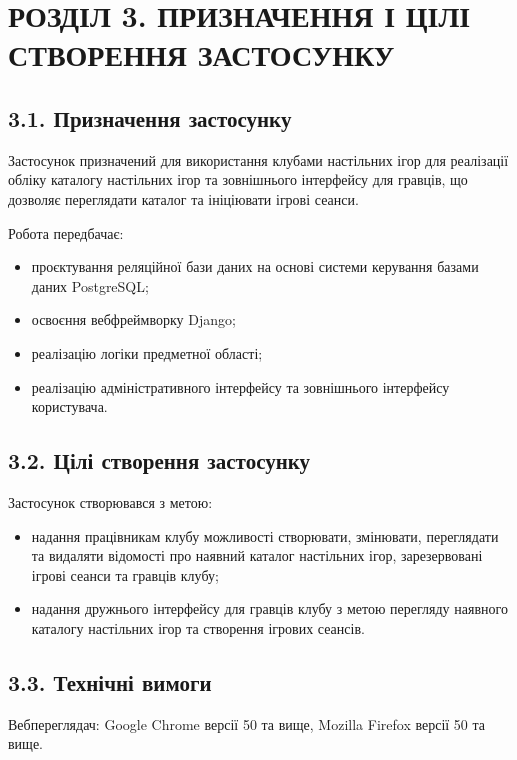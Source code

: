 \documentclass[a4paper, 14pt]{extarticle}
\begin{document}
  \clearpage
  \section{РОЗДІЛ 3. ПРИЗНАЧЕННЯ І ЦІЛІ СТВОРЕННЯ ЗАСТОСУНКУ}

  \subsection{3.1. Призначення застосунку}
  Застосунок призначений для використання клубами настільних ігор для реалізації
  обліку каталогу настільних ігор та зовнішнього інтерфейсу для гравців, що дозволяє
  переглядати каталог та ініціювати ігрові сеанси.

  Робота передбачає:

  \begin{itemize}[nosep]
    \item проєктування реляційної бази даних на основі системи керування
      базами даних PostgreSQL;
    \item освоєння вебфреймворку Django;
    \item реалізацію логіки предметної області;
    \item реалізацію адміністративного інтерфейсу та зовнішнього інтерфейсу користувача.
  \end{itemize}

  \subsection{3.2. Цілі створення застосунку}
  Застосунок створювався з метою:

  \begin{itemize}[nosep]
    \item надання працівникам клубу можливості створювати, змінювати,
      переглядати та видаляти відомості про наявний каталог настільних ігор,
      зарезервовані ігрові сеанси та гравців клубу;
    \item надання дружнього інтерфейсу для гравців клубу з метою перегляду
      наявного каталогу настільних ігор та створення ігрових сеансів.
  \end{itemize}

  \clearpage
  \subsection{3.3. Технічні вимоги}
  Вебпереглядач: Google Chrome версії 50 та вище, Mozilla Firefox версії 50 та вище.
\end{document}
